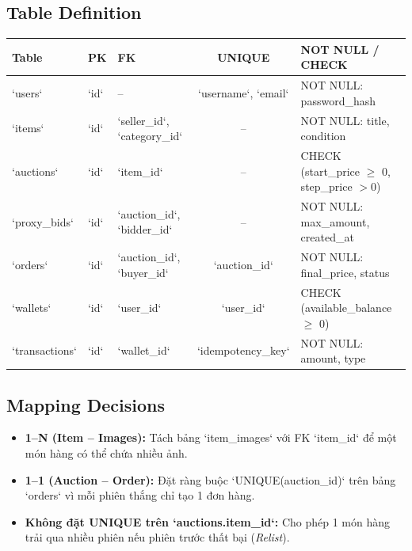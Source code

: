 \documentclass[11pt,a4paper]{article}
\begin{document}
\subsection{Table Definition}
\begin{table}[H]
    \centering
    \small
    \begin{tabularx}{\textwidth}{|l|l|l|c|X|}
        \hline
        \textbf{Table} & \textbf{PK} & \textbf{FK} & \textbf{UNIQUE} & \textbf{NOT NULL / CHECK} \\ \hline
        `users` & `id` & -- & `username`, `email` & NOT NULL: password\_hash \\ \hline
        `items` & `id` & `seller_id`, `category_id` & -- & NOT NULL: title, condition \\ \hline
        `auctions` & `id` & `item_id` & -- & CHECK (start\_price $\ge$ 0, step\_price $> 0$) \\ \hline
        `proxy_bids` & `id` & `auction_id`, `bidder_id` & -- & NOT NULL: max\_amount, created\_at \\ \hline
        `orders` & `id` & `auction_id`, `buyer_id` & `auction_id` & NOT NULL: final\_price, status \\ \hline
        `wallets` & `id` & `user_id` & `user_id` & CHECK (available\_balance $\ge$ 0) \\ \hline
        `transactions` & `id` & `wallet_id` & `idempotency_key` & NOT NULL: amount, type \\ \hline
    \end{tabularx}
\end{table}

\subsection{Mapping Decisions}
\begin{itemize}[leftmargin=*]
    \item \textbf{1--N (Item -- Images):} Tách bảng `item_images` với FK `item_id` để một món hàng có thể chứa nhiều ảnh.
    \item \textbf{1--1 (Auction -- Order):} Đặt ràng buộc `UNIQUE(auction_id)` trên bảng `orders` vì mỗi phiên thắng chỉ tạo 1 đơn hàng.
    \item \textbf{Không đặt UNIQUE trên `auctions.item_id`:} Cho phép 1 món hàng trải qua nhiều phiên nếu phiên trước thất bại (\textit{Relist}).
\end{itemize}
\end{document}
